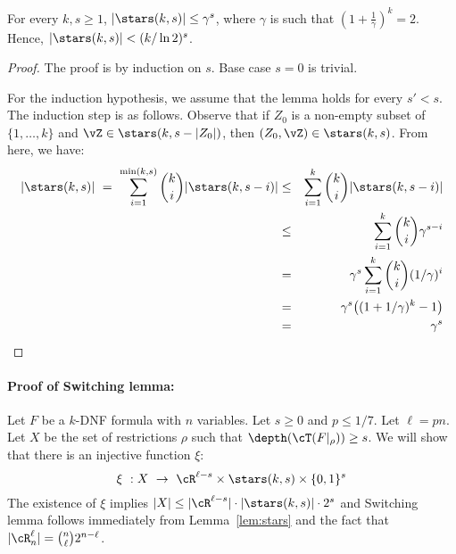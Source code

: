 \documentclass[11pt, a4paper]{article}
\begin{document}
\begin{lemma}
\label{lem:stars}
For every $k,s\geq 1$, $|\stars(k,s)|\leq \gamma^s$, where $\gamma$ is such that $(1+\frac{1}{\gamma})^k=2$.
Hence, $|\stars(k,s)|< (k/\ln 2)^s$.
\end{lemma}
\begin{proof}
The proof is by induction on $s$.
Base case $s=0$ is trivial.

For the induction hypothesis, we assume that the lemma holds for every $s'<s$.
The induction step is as follows.
Observe that if $Z_0$ is a non-empty subset of $\{1,\ldots,k\}$ and $\vZ \in \stars(k,s-|Z_0|)$,
then $(Z_0,\vZ)\in\stars(k,s)$.
From here, we have:
\begin{eqnarray*}
|\stars(k,s)| \ = \ \sum_{i=1}^{\min(k,s)} {k\choose i} |\stars(k,s-i)|
& \leq & \sum_{i=1}^k {k\choose i} |\stars(k,s-i)|
\\
& \leq & \sum_{i=1}^k {k\choose i} \gamma^{s-i}
\\
& = & \gamma^s \sum_{i=1}^k {k\choose i} (1/\gamma)^i
\\
& = & \gamma^s \big( (1+1/\gamma)^k -1\big)
\\
& = & \gamma^s
\end{eqnarray*}
\end{proof}


\paragraph*{Proof of Switching lemma:}
Let $F$ be a $k$-DNF formula with $n$ variables.
Let $s\geq 0$ and $p \leq 1/7$.
Let $\ell = pn$.
Let $X$ be the set of restrictions $\rho$ such that $\depth(\cT(F|_{\rho}))\geq s$.
We will show that there is an injective function $\xi$:
$$
\xi \ :  X\ \to\ \cR^{\ell-s}\times \stars(k,s)\times \{0,1\}^s
$$
The existence of $\xi$ implies
$|X|  \leq  |\cR^{\ell-s}|\cdot |\stars(k,s)|\cdot 2^s$
and Switching lemma follows immediately from Lemma~\ref{lem:stars} and 
the fact that $|\cR^{\ell}_n| = {n\choose \ell}2^{n-\ell}$.
\end{document}
